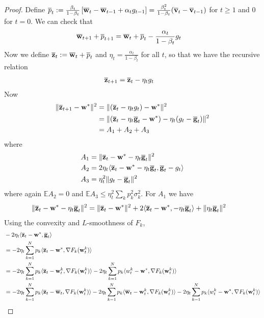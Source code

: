 \begin{proof}
	Define $\overline{p}_{t}:=\frac{\beta_{t}}{1-\beta_{t}}\left[{\overline{\mathbf{w}}}_{t}-{\overline{\mathbf{w}}}_{t-1}+\alpha_{t}g_{t-1}\right]=\frac{\beta_{t}^{2}}{1-\beta_{t}}({\overline{\mathbf{v}}}_{t}-{\overline{\mathbf{v}}}_{t-1})$
	for $t\geq1$ and 0 for $t=0$. We can check that 
	\begin{align*}
	{\overline{\mathbf{w}}}_{t+1}+\overline{p}_{t+1} & ={\overline{\mathbf{w}}}_{t}+\overline{p}_{t}-\frac{\alpha_{t}}{1-\beta_{t}}g_{t}
	\end{align*}
	Now we define ${\overline{\mathbf{z}}}_{t}:={\overline{\mathbf{w}}}_{t}+\overline{p}_{t}$
	and $\eta_{t}=\frac{\alpha_{t}}{1-\beta_{t}}$ for all $t$, so that
	we have the recursive relation 
	\begin{align*}
	{\overline{\mathbf{z}}}_{t+1} & ={\overline{\mathbf{z}}}_{t}-\eta_{t}g_{t}
	\end{align*}
	Now 
	\begin{align*}
	\|{\overline{\mathbf{z}}}_{t+1}-{\mathbf{w}}^{\ast}\|^{2} & =\|({\overline{\mathbf{z}}}_{t}-\eta_{t}g_{t})-{\mathbf{w}}^{\ast}\|^{2}\\
	& =\|({\overline{\mathbf{z}}}_{t}-\eta_{t}{\overline{\mathbf{g}}}_{t}-{\mathbf{w}}^{\ast})-\eta_{t}(g_{t}-{\overline{\mathbf{g}}}_{t})\|^{2}\\
	& =A_{1}+A_{2}+A_{3}
	\end{align*}
	where 
	\begin{align*}
	A_{1} & =\|{\overline{\mathbf{z}}}_{t}-{\mathbf{w}}^{\ast}-\eta_{t}{\overline{\mathbf{g}}}_{t}\|^{2}\\
	A_{2} & =2\eta_{t}\langle{\overline{\mathbf{z}}}_{t}-{\mathbf{w}}^{\ast}-\eta_{t}{\overline{\mathbf{g}}}_{t},{\overline{\mathbf{g}}}_{t}-g_{t}\rangle\\
	A_{3} & =\eta_{t}^{2}\|g_{t}-{\overline{\mathbf{g}}}_{t}\|^{2}
	\end{align*}
	where again $\mathbb{E}A_{2}=0$ and $\mathbb{E}A_{3}\leq\eta_{t}^{2}\sum_{k}p_{k}^{2}\sigma_{k}^{2}$.
	For $A_{1}$ we have 
	\begin{align*}
	\|{\overline{\mathbf{z}}}_{t}-{\mathbf{w}}^{\ast}-\eta_{t}{\overline{\mathbf{g}}}_{t}\|^{2} & =\|{\overline{\mathbf{z}}}_{t}-{\mathbf{w}}^{\ast}\|^{2}+2\langle{\overline{\mathbf{z}}}_{t}-{\mathbf{w}}^{\ast},-\eta_{t}{\overline{\mathbf{g}}}_{t}\rangle+\|\eta_{t}{\overline{\mathbf{g}}}_{t}\|^{2}
	\end{align*}
	Using the convexity and $L$-smoothness of $F_{k}$, 
	\begin{align*}
	& -2\eta_{t}\langle\ov{z}_{t}-\vw^{\ast},\ov{g}_{t}\rangle\\
	& =-2\eta_{t}\sum_{k=1}^{N}p_{k}\langle\ov{z}_{t}-\vw^{\ast},\nabla F_{k}(\vw_{t}^{k})\rangle\\
	& =-2\eta_{t}\sum_{k=1}^{N}p_{k}\langle\ov{z}_{t}-\vw_{t}^{k},\nabla F_{k}(\vw_{t}^{k})\rangle-2\eta_{t}\sum_{k=1}^{N}p_{k}\langle w_{t}^{k}-\vw^{\ast},\nabla F_{k}(\vw_{t}^{k})\rangle\\
	& =-2\eta_{t}\sum_{k=1}^{N}p_{k}\langle\ov{z}_{t}-\ov{w}_{t},\nabla F_{k}(\vw_{t}^{k})\rangle-2\eta_{t}\sum_{k=1}^{N}p_{k}\langle\ov{w}_{t}-\vw_{t}^{k},\nabla F_{k}(\vw_{t}^{k})\rangle-2\eta_{t}\sum_{k=1}^{N}p_{k}\langle w_{t}^{k}-\vw^{\ast},\nabla F_{k}(\vw_{t}^{k})\rangle\\

\end{align*}
\end{proof}

